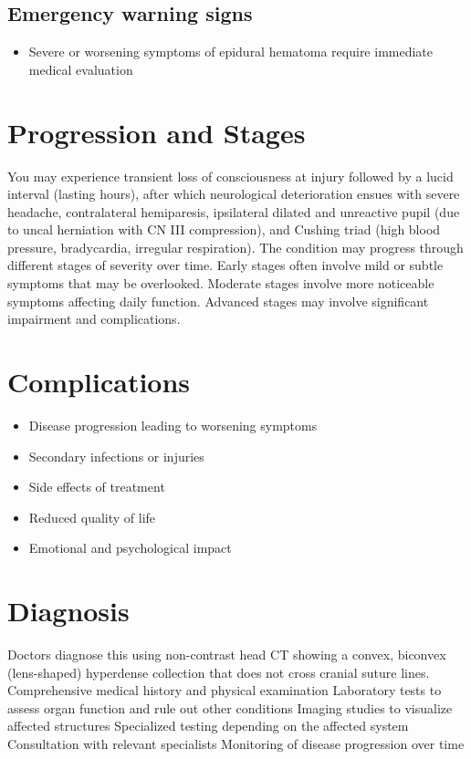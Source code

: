 \subsection{Emergency warning signs}
\begin{itemize}[noitemsep]
  \item Severe or worsening symptoms of epidural hematoma require immediate medical evaluation
\end{itemize}
\section{Progression and Stages}
You may experience transient loss of consciousness at injury followed by a lucid interval (lasting hours), after which neurological deterioration ensues with severe headache, contralateral hemiparesis, ipsilateral dilated and unreactive pupil (due to uncal herniation with CN III compression), and Cushing triad (high blood pressure, bradycardia, irregular respiration). The condition may progress through different stages of severity over time. Early stages often involve mild or subtle symptoms that may be overlooked. Moderate stages involve more noticeable symptoms affecting daily function. Advanced stages may involve significant impairment and complications.
\section{Complications}
\begin{itemize}[noitemsep]
  \item Disease progression leading to worsening symptoms
  \item Secondary infections or injuries
  \item Side effects of treatment
  \item Reduced quality of life
  \item Emotional and psychological impact
\end{itemize}
\section{Diagnosis}
Doctors diagnose this using non-contrast head CT showing a convex, biconvex (lens-shaped) hyperdense collection that does not cross cranial suture lines. Comprehensive medical history and physical examination Laboratory tests to assess organ function and rule out other conditions Imaging studies to visualize affected structures Specialized testing depending on the affected system Consultation with relevant specialists Monitoring of disease progression over time

